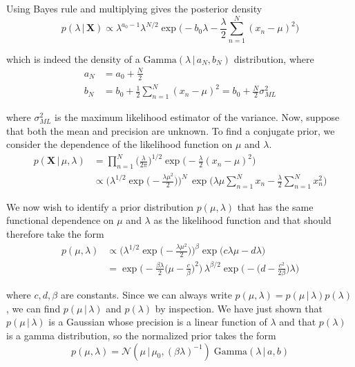   Using Bayes rule and multiplying gives the posterior density
  \begin{equation}
    p(\lambda\,|\,\mathbf{X}) \propto \lambda^{a_0 - 1} \lambda^{N/2} \exp\bigg( -b_0 \lambda - \frac{\lambda}{2} \sum_{n=1}^N (x_n - \mu)^2 \bigg)
  \end{equation}

  which is indeed the density of a $\text{Gamma}(\lambda\,|\,a_N, b_N)$ distribution, where
  \begin{align*}
    a_N & = a_0 + \frac{N}{2} \\
    b_N & = b_0 + \frac{1}{2} \sum_{n=1}^N (x_n - \mu)^2 = b_0 + \frac{N}{2} \sigma_{ML}^2
  \end{align*}

  where $\sigma_{ML}^2$ is the maximum likelihood estimator of the variance. Now, suppose that both the mean and precision are unknown. To find a conjugate prior, we consider the dependence of the likelihood function on $\mu$ and $\lambda$.
  \begin{align*}
    p(\mathbf{X}\,|\,\mu, \lambda) & = \prod_{n=1}^N \bigg(\frac{\lambda}{2\pi}\bigg)^{1/2} \exp \bigg( -\frac{\lambda}{2} (x_n - \mu)^2 \bigg) \\
    & \propto \bigg(\lambda^{1/2} \exp \Big(-\frac{\lambda \mu^2}{2} \Big) \bigg)^N \, \exp \bigg( \lambda \mu \sum_{n=1}^N x_n - \frac{\lambda}{2} \sum_{n=1}^N x_n^2 \bigg)
  \end{align*}

  We now wish to identify a prior distribution $p(\mu, \lambda)$ that has the same functional dependence on $\mu$ and $\lambda$ as the likelihood function and that should therefore take the form
  \begin{align*}
    p(\mu, \lambda) & \propto \bigg( \lambda^{1/2} \exp \Big(-\frac{\lambda \mu^2}{2}\Big) \bigg)^\beta \exp\big( c \lambda \mu - d \lambda \big) \\
    & = \exp \bigg( -\frac{\beta \lambda}{2} \Big(\mu - \frac{c}{\beta} \Big)^2 \bigg) \, \lambda^{\beta/2} \exp \bigg(-\Big(d - \frac{c^2}{2\beta}\Big) \lambda \bigg)
  \end{align*}

  where $c, d, \beta$ are constants. Since we can always write $p(\mu, \lambda) = p(\mu\,|\,\lambda) p(\lambda)$, we can find $p(\mu\,|\,\lambda)$ and $p(\lambda)$ by inspection. We have just shown that $p(\mu \,|\, \lambda)$ is a Gaussian whose precision is a linear function of $\lambda$ and that $p(\lambda)$ is a gamma distribution, so the normalized prior takes the form
  \begin{equation}
    p(\mu, \lambda) = \mathcal{N}(\mu \,|\, \mu_0, (\beta\lambda)^{-1}) \; \text{Gamma}(\lambda\,|\,a, b)
  \end{equation}

